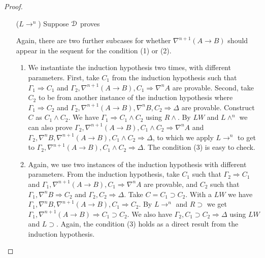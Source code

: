 \begin{proof}
\begin{enumerate}
	\item[($L \rightarrow ^n$)] Suppose $\D$ proves
  \begin{prooftree}
  \end{prooftree}
  Again, there are two further subcases for whether $\nabla^{n+1} (A \rightarrow B)$ should appear in the sequent for the condition (1) or (2).
	\begin{enumerate}
		\item We instantiate the induction hypothesis two times, with different parameters. First, take $C_1$ from the induction hypothesis such that $\Gamma_1 \Rightarrow C_1$ and $\Gamma_2, \nabla^{n+1} (A \rightarrow B), C_1 \Rightarrow \nabla^n A$ are provable. Second, take $C_2$ to be from another instance of the induction hypothesis where $\Gamma_1 \Rightarrow C_2$ and $\Gamma_2, \nabla^{n+1} (A \rightarrow B), \nabla^n B, C_2 \Rightarrow \Delta$ are provable. Construct $C$ as $C_1 \wedge C_2$.	We have $\Gamma_1 \Rightarrow C_1 \wedge C_2$ using $R \wedge$. By $LW$ and $L \wedge ^n$ we can also prove $\Gamma_2, \nabla^{n+1} (A \rightarrow B), C_1 \wedge C_2 \Rightarrow \nabla^n A$ and $\Gamma_2 , \nabla^n B, \nabla^{n+1} (A \rightarrow B), C_1 \wedge C_2 \Rightarrow \Delta$, to which we apply $L \rightarrow ^n$ to get to $\Gamma_2 , \nabla^{n+1} (A \rightarrow B) , C_1 \wedge C_2 \Rightarrow \Delta$.
		The condition (3) is easy to check.

		\item Again, we use two instances of the induction hypothesis with different parameters. From the induction hypothesis, take $C_1$ such that $\Gamma_2 \Rightarrow C_1$ and $\Gamma_1, \nabla^{n+1} (A \rightarrow B), C_1 \Rightarrow \nabla^n A$ are provable, and $C_2$ such that $\Gamma_1, \nabla^n B \Rightarrow C_2$ and $\Gamma_2, C_2 \Rightarrow \Delta$. Take $C = C_1 \supset C_2$. With a $LW$ we have $\Gamma_1, \nabla^n B, \nabla^{n+1} (A \rightarrow B), C_1 \Rightarrow C_2$. By $L \rightarrow ^n$ and $R \supset$ we get $\Gamma_1, \nabla^{n+1} (A \rightarrow B) \Rightarrow C_1 \supset C_2$.
		We also have $\Gamma_2, C_1 \supset C_2 \Rightarrow \Delta$ using $LW$ and $L \supset$. Again, the condition (3) holds as a direct result from the induction hypothesis.
	\end{enumerate}


\end{enumerate}
\end{proof}
